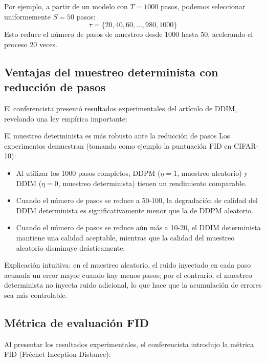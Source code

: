 \documentclass[a4paper]{article}
\begin{document}
Por ejemplo, a partir de un modelo con $T=1000$ pasos, podemos seleccionar uniformemente $S=50$ pasos:
$$
\tau = \{20, 40, 60, \ldots, 980, 1000\}
$$
Esto reduce el número de pasos de muestreo desde 1000 hasta 50, acelerando el proceso 20 veces.

\subsection{Ventajas del muestreo determinista con reducción de pasos}

El conferencista presentó resultados experimentales del artículo de DDIM, revelando una ley empírica importante:

\begin{importantbox}{El muestreo determinista es más robusto ante la reducción de pasos}
Los experimentos demuestran (tomando como ejemplo la puntuación FID en CIFAR-10):
\begin{itemize}
    \item Al utilizar los 1000 pasos completos, DDPM ($\eta=1$, muestreo aleatorio) y DDIM ($\eta=0$, muestreo determinista) tienen un rendimiento comparable.
    \item Cuando el número de pasos se reduce a 50-100, la degradación de calidad del DDIM determinista es significativamente menor que la de DDPM aleatorio.
    \item Cuando el número de pasos se reduce aún más a 10-20, el DDIM determinista mantiene una calidad aceptable, mientras que la calidad del muestreo aleatorio disminuye drásticamente.
\end{itemize}
Explicación intuitiva: en el muestreo aleatorio, el ruido inyectado en cada paso acumula un error mayor cuando hay menos pasos; por el contrario, el muestreo determinista no inyecta ruido adicional, lo que hace que la acumulación de errores sea más controlable.
\end{importantbox}

\subsection{Métrica de evaluación FID}

Al presentar los resultados experimentales, el conferencista introdujo la métrica FID (Fr\'{e}chet Inception Distance):
\end{document}
